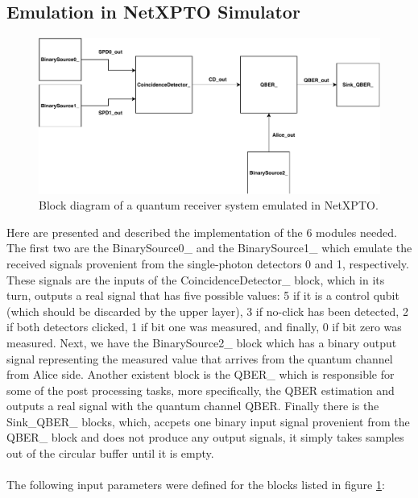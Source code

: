 \begin{refsection}
\subsection{Emulation in NetXPTO Simulator}

\vspace{11pt}

\begin{figure}[H]
	\centering
	\includegraphics[width=0.9\linewidth]{./sdf/arduino_quantum_rx/figures/NetXPTO_implementation.pdf}
	\caption{Block diagram of a quantum receiver system emulated in NetXPTO.}
	\label{fig:netxpto}
\end{figure}

Here are presented and described the implementation of the 6 modules needed. The first two are the BinarySource0\_ and the BinarySource1\_ which emulate the received signals provenient from the single-photon detectors 0 and 1, respectively. These signals are the inputs of the CoincidenceDetector\_ block, which in its turn, outputs a real signal that has five possible values: 5 if it is a control qubit (which should be discarded by the upper layer), 3 if no-click has been detected, 2 if both detectors clicked, 1 if bit one was measured, and finally, 0 if bit zero was measured. Next, we have the BinarySource2\_ block which has a binary output signal representing the measured value that arrives from the quantum channel from Alice side. Another existent block is the QBER\_ which is responsible for some of the post processing tasks, more specifically, the QBER estimation and outputs a real signal with the quantum channel QBER. Finally there is the Sink\_QBER\_ blocks, which, accpets one binary input signal provenient from the QBER\_ block and does not produce any output signals, it simply takes samples out of the circular buffer until it is empty.\\ \\

The following input parameters were defined for the blocks listed in figure \ref{fig:netxpto}:


\end{refsection}
